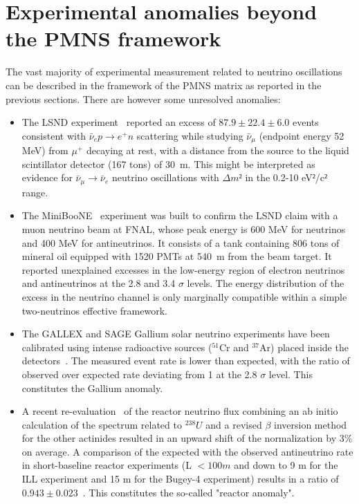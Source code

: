 \section{Experimental anomalies beyond the PMNS framework}
\label{sec:anomalies}

The vast majority of experimental measurement related to neutrino oscillations can be described in the framework of the PMNS matrix as reported in the previous sections. There are however some unresolved anomalies: 
\begin{itemize}
\item The LSND experiment~\cite{lsnd} reported an excess of $87.9 \pm 22.4 \pm 6.0$ events consistent with $\bar{\nu}_e p \rightarrow e^+ n$ scattering while studying $\bar{\nu}_\mu$ (endpoint energy 52 MeV) from $\mu^+$ decaying at rest, with a distance from the source to the liquid scintillator detector (167 tons) of 30~m. This might be interpreted as evidence for $\bar{\nu}_\mu \rightarrow  \bar{\nu}_e$ neutrino oscillations with $\Delta m²$ in the 0.2-10 eV$²$/c$²$ range.
\item The MiniBooNE~\cite{miniboone1,miniboone2} experiment was built to confirm the LSND claim with a muon neutrino beam at FNAL, whose peak energy is 600 MeV for neutrinos and 400 MeV for antineutrinos. It consists of a tank containing 806 tons of mineral oil equipped with 1520 PMTs at 540~m from the beam target. It reported unexplained excesses in the low-energy region of electron neutrinos and antineutrinos at the 2.8 and 3.4 $\sigma$ levels. The energy distribution of the excess in the neutrino channel is only marginally compatible within a simple two-neutrinos effective framework. 
\item The GALLEX and SAGE Gallium solar neutrino experiments have been calibrated using intense radioactive sources ($^{51}$Cr and $^{37}$Ar) placed inside the detectors~\cite{gallium}. The measured event rate is lower than expected, with the ratio of observed over expected rate deviating from 1 at the 2.8 $ \sigma$ level. This constitutes the Gallium anomaly. 
\item A recent re-evaluation~\cite{mueller} of the reactor neutrino flux combining an ab initio calculation of the spectrum related to $^{238} U$ and a revised $\beta$ inversion method for the other actinides resulted in an upward shift of the normalization by 3\% on average. A comparison of the expected with the observed antineutrino rate in short-baseline reactor experiments (L $< 100 m$ and down to 9 m for the ILL experiment and 15 m for the Bugey-4 experiment) results in a ratio of $ 0.943 \pm 0.023$~\cite{mention}. This constitutes the so-called "reactor anomaly". 
\end{itemize}

